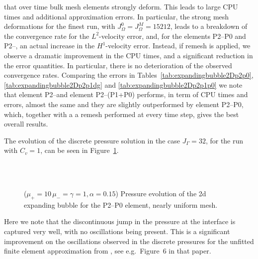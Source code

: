 that over time bulk mesh elements strongly deform. This leads to large CPU
times and additional approximation errors. In particular, the strong mesh
deformations for the finest run, with $J_\Omega^0 = J_\Omega^M = 15212$, leads
to a breakdown of the convergence rate for the $L^2$-velocity error, and, for
the elements P2--P0 and P2--\pdg, an actual increase in the $H^1$-velocity
error. Instead, if remesh is applied, we observe a dramatic improvement in the
CPU times, and a significant reduction in the error quantities. In particular,
there is no deterioration of the observed convergence rates. Comparing the
errors in Tables~\ref{tab:expandingbubble2Dp2p0},
\ref{tab:expandingbubble2Dp2p1dg} and \ref{tab:expandingbubble2Dp2p1p0} we note
that element P2--\pdg and element P2--(P1+P0) performs, in term of CPU times
and errors, almost the same and they are slightly outperformed by element
P2--P0, which, together with a a remesh performed at every time step, gives the
best overall results.

The evolution of the discrete pressure solution in the case $J_\Gamma = 32$,
for the run with $C_v = 1$, can be seen in
Figure~\ref{fig:expanding_bubble_uniform}.
\begin{figure}[htbp]
\centering
{}\\
\\
\caption[Stokes expanding bubble pressure uniform mesh]
{($\mu_+ = 10\,\mu_- = \gamma = 1,\alpha = 0.15$) Pressure evolution of
the 2d expanding bubble for the P2--P0 element, nearly uniform mesh.}
\label{fig:expanding_bubble_uniform}
\end{figure}
Here we note that the discontinuous jump in the pressure at the interface is
captured very well, with no oscillations being present. This is a significant
improvement on the oscillations observed in the discrete pressures for the
unfitted finite element approximation from \cite{spurious}, see e.g.\
Figure~6 in that paper.

